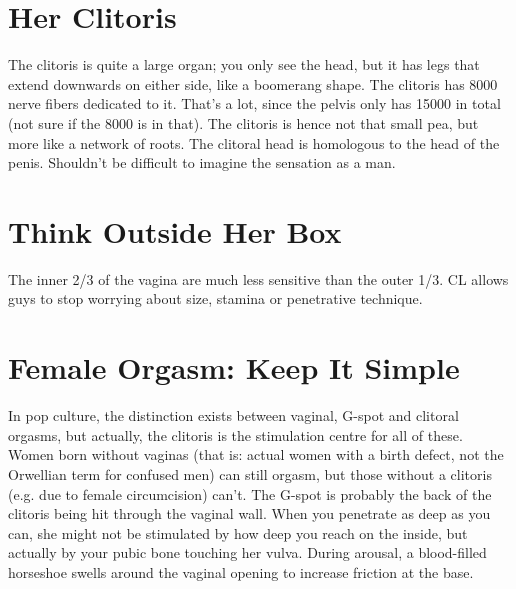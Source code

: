 \section{Her Clitoris}
\begin{outline}
\1 The clitoris is quite a large organ; you only see the head, but it has legs that extend downwards on either side, like a boomerang shape.
\1 The clitoris has 8000 nerve fibers dedicated to it. That's a lot, since the pelvis only has 15000 in total (not sure if the 8000 is in that).
\1 The clitoris is hence not that small pea, but more like a network of roots.
\1 The clitoral head is homologous to the head of the penis. Shouldn't be difficult to imagine the sensation as a man.
\end{outline}

\section{Think Outside Her Box}
\begin{outline}
\1 The inner 2/3 of the vagina are much less sensitive than the outer 1/3.
\1 CL allows guys to stop worrying about size, stamina or penetrative technique.
\end{outline}

\section{Female Orgasm: Keep It Simple}
\begin{outline}
\1 In pop culture, the distinction exists between vaginal, G-spot and clitoral orgasms, but actually, the clitoris is the stimulation centre for all of these.
\1 Women born without vaginas (that is: actual women with a birth defect, not the Orwellian term for confused men) can still orgasm, but those without a clitoris (e.g. due to female circumcision) can't.
\1 The G-spot is probably the back of the clitoris being hit through the vaginal wall.
\1 When you penetrate as deep as you can, she might not be stimulated by how deep you reach on the inside, but actually by your pubic bone touching her vulva.
\1 During arousal, a blood-filled horseshoe swells around the vaginal opening to increase friction at the base.
\end{outline}

